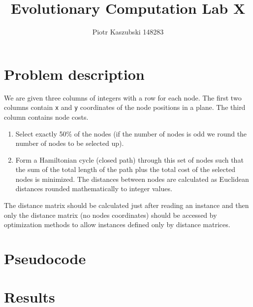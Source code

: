 \documentclass[14pt]{article}
\title{Evolutionary Computation Lab X}
\author{Piotr Kaszubski 148283}
\date{}
\begin{document}
\maketitle
\tableofcontents
\newpage

\section{Problem description}
We are given three columns of integers with a row for each node. The first two
columns contain \verb`x` and \verb`y` coordinates of the node positions in a
plane. The third column contains node costs.

\begin{enumerate}
	\item Select exactly 50\% of the nodes (if the number of nodes is odd we
		round the number of nodes to be selected up).
	\item Form a Hamiltonian cycle (closed path) through this set of nodes such
		that the sum of the total length of the path plus the total cost of the
		selected nodes is minimized. The distances between nodes are calculated
		as Euclidean distances rounded mathematically to integer values.
\end{enumerate}

The distance matrix should be calculated just after reading an instance and
then only the distance matrix (no nodes coordinates) should be accessed by
optimization methods to allow instances defined only by distance matrices.

\section{Pseudocode}

\section{Results}
\end{document}
